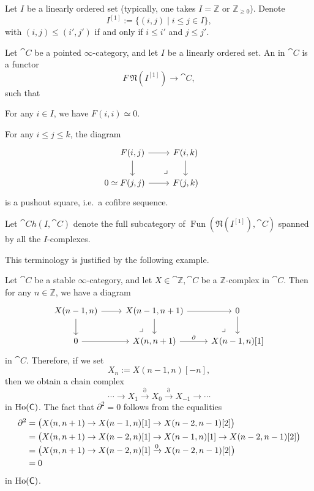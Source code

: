 Let $I$ be a linearly ordered set (typically, one takes
$I=\mathbb Z$ or $\mathbb Z_{\geq0}$). Denote
\[I^{[1]}:=\{(i,j)\mid i\leq j\in I\},\] 
with $(i,j)\leq(i',j')$ if and only if $i\leq i'$ and $j\leq j'$.

\begin{definition}
    Let $\cat{C}$ be a pointed $\infty$-category,
    and let $I$ be a linearly ordered set.
    An  in $\cat{C}$ is a functor 
    \[F\:\mathfrak{N}(I^{[1]})\to\cat{C},\]
    such that 
    \begin{itms}
        \item For any $i\in I$, we have $F(i,i)\simeq0$.
        \item For any $i\leq j\leq k$, the diagram 
        \[\begin{tikzcd}
            F(i,j)\ar[r]\ar[d]\ar[dr,phantom,pos=.75,"\lrcorner"] & F(i,k)\ar[d] \\
            \llap{$0\simeq{}$}F(j,j)\ar[r] & F(j,k)
        \end{tikzcd}\]
        is a pushout square, i.e.\ a cofibre sequence.
    \end{itms}
    Let $\cat{Ch}(I,\cat{C})$ denote the full subcategory of
    $\operatorname{Fun}(\mathfrak N(I^{[1]}),\cat{C})$
    spanned by all the $I$-complexes.
\end{definition}

This terminology is justified by the following example.

\begin{example}
    Let $\cat{C}$ be a stable $\infty$-category,
    and let $X\in\cat{\mathbb{Z},\cat{C}}$ be a $\mathbb{Z}$-complex in $\cat{C}$.
    Then for any $n\in\mathbb{Z}$, we have a diagram
    \[\begin{tikzcd}
        X(n-1,n)\ar[r]\ar[d]\ar[dr,phantom,end anchor=north,pos=.75,"\lrcorner"] &
        X(n-1,n+1)\ar[r]\ar[d]\ar[dr,phantom,end anchor=north,pos=.75,"\lrcorner"] & 0\ar[d] \\
        0\ar[r] & X(n,n+1)\ar[r,"\partial"] & X(n-1,n)[1]
    \end{tikzcd}\]
    in $\cat{C}$. Therefore, if we set 
    \[X_n:=X(n-1,n)[-n],\]
    then we obtain a chain complex 
    \[ \cdots\to X_1\xrightarrow{\partial}X_0\xrightarrow{\partial}X_{-1}\to\cdots \]
    in $\operatorname{Ho}(\mathsf{C})$. The fact that $\partial^2=0$ follows from the equalities
    \[\begin{aligned}
        \partial^2
        &=\bigl(X(n,n+1)\to X(n-1,n)[1]\to X(n-2,n-1)[2]\bigr)\\
        &=\bigl(X(n,n+1)\to X(n-2,n)[1]\to X(n-1,n)[1]\to X(n-2,n-1)[2]\bigr)\\
        &=\bigl(X(n,n+1)\to X(n-2,n)[1]\smash{{}\xrightarrow0{}}X(n-2,n-1)[2]\bigr)\\
        &=0
    \end{aligned}\]
    in $\operatorname{Ho}(\mathsf{C})$. \varqed
\end{example}

